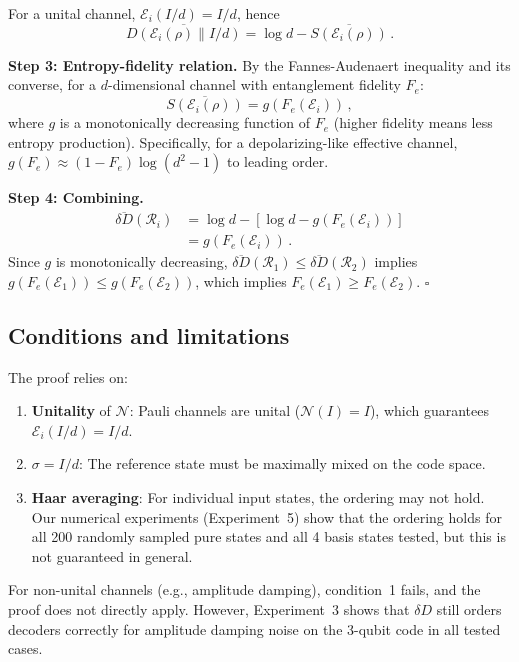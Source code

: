 \documentclass[12pt]{article}
\newcommand{\Petz}{\mathcal{R}}
\newcommand{\chan}{\mathcal{N}}
\newcommand{\dd}{\delta\!D}
\begin{document}
For a unital channel, $\mathcal{E}_i(I/d) = I/d$, hence
\begin{equation}
  \overline{D(\mathcal{E}_i(\rho)\|I/d)} = \log d - \overline{S(\mathcal{E}_i(\rho))}\,.
\end{equation}

\textbf{Step 3: Entropy-fidelity relation.} By the Fannes-Audenaert inequality and its converse, for a $d$-dimensional channel with entanglement fidelity $F_e$:
\begin{equation}
  \overline{S(\mathcal{E}_i(\rho))} = g(F_e(\mathcal{E}_i))\,,
\end{equation}
where $g$ is a monotonically decreasing function of $F_e$ (higher fidelity means less entropy production). Specifically, for a depolarizing-like effective channel, $g(F_e) \approx (1-F_e)\log(d^2-1)$ to leading order.

\textbf{Step 4: Combining.}
\begin{align}
  \overline{\dd}(\Petz_i) &= \log d - [\log d - g(F_e(\mathcal{E}_i))] \\
                           &= g(F_e(\mathcal{E}_i))\,.
\end{align}
Since $g$ is monotonically decreasing, $\overline{\dd}(\Petz_1) \leq \overline{\dd}(\Petz_2)$ implies $g(F_e(\mathcal{E}_1)) \leq g(F_e(\mathcal{E}_2))$, which implies $F_e(\mathcal{E}_1) \geq F_e(\mathcal{E}_2)$. \hfill $\square$

\subsection{Conditions and limitations}

The proof relies on:
\begin{enumerate}
  \item \textbf{Unitality} of $\chan$: Pauli channels are unital ($\chan(I) = I$), which guarantees $\mathcal{E}_i(I/d) = I/d$.
  \item \textbf{$\sigma = I/d$}: The reference state must be maximally mixed on the code space.
  \item \textbf{Haar averaging}: For individual input states, the ordering may not hold. Our numerical experiments (Experiment~5) show that the ordering holds for all 200 randomly sampled pure states and all 4 basis states tested, but this is not guaranteed in general.
\end{enumerate}

For non-unital channels (e.g., amplitude damping), condition~1 fails, and the proof does not directly apply. However, Experiment~3 shows that $\dd$ still orders decoders correctly for amplitude damping noise on the 3-qubit code in all tested cases.
\end{document}
